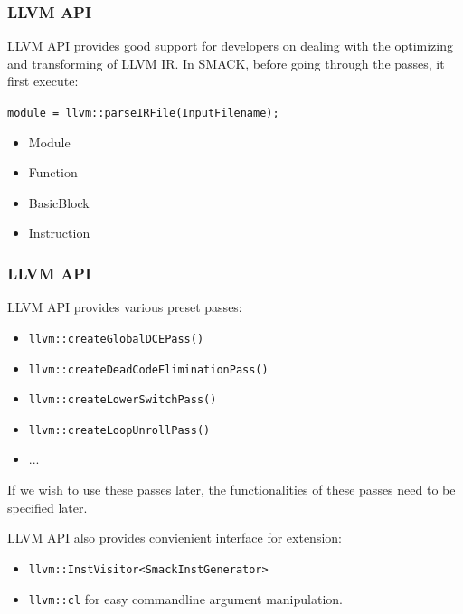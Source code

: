 \documentclass[11pt]{beamer}
\begin{document}
\begin{frame}\frametitle{LLVM API}
LLVM API provides good support for developers on dealing with the optimizing and transforming of LLVM IR. In SMACK, before going through the passes, it first execute:
\begin{center}

\texttt{module = llvm::parseIRFile(InputFilename);}
\end{center}




\begin{itemize}
\item Module

\item Function

\item BasicBlock

\item Instruction
\end{itemize}

\end{frame}


\begin{frame}\frametitle{LLVM API}
LLVM API provides various preset passes:
\begin{itemize}
\item \texttt{llvm::createGlobalDCEPass()}
\item \texttt{llvm::createDeadCodeEliminationPass()}
\item \texttt{llvm::createLowerSwitchPass()}
\item \texttt{llvm::createLoopUnrollPass()}
\item ...
\end{itemize}

If we wish to use these passes later, the functionalities of these passes need to be specified later.

LLVM API also provides convienient interface for extension:

\begin{itemize}
\item \texttt{llvm::InstVisitor<SmackInstGenerator>}
\item \texttt{llvm::cl} for easy commandline argument manipulation.
\end{itemize}
\end{frame}
\end{document}
